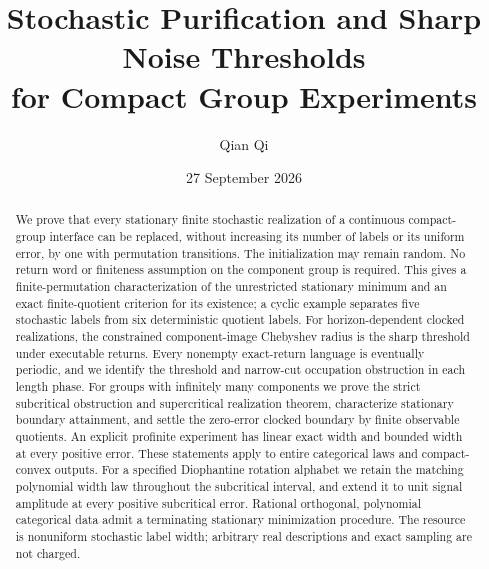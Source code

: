 \documentclass[11pt]{amsart}
\title[Stochastic purification and noise thresholds]{Stochastic Purification and Sharp Noise Thresholds\\for Compact Group Experiments}
\author{Qian Qi}
\date{27 September 2026}
\numberwithin{equation}{section}
\theoremstyle{definition}\newtheorem{definition}[theorem]{Definition}
\theoremstyle{remark}\newtheorem{remark}[theorem]{Remark}
\begin{document}
\begin{abstract}
We prove that every stationary finite stochastic realization of a continuous compact-group interface can be replaced, without increasing its number of labels or its uniform error, by one with permutation transitions. The initialization may remain random. No return word or finiteness assumption on the component group is required. This gives a finite-permutation characterization of the unrestricted stationary minimum and an exact finite-quotient criterion for its existence; a cyclic example separates five stochastic labels from six deterministic quotient labels. For horizon-dependent clocked realizations, the constrained component-image Chebyshev radius is the sharp threshold under executable returns. Every nonempty exact-return language is eventually periodic, and we identify the threshold and narrow-cut occupation obstruction in each length phase. For groups with infinitely many components we prove the strict subcritical obstruction and supercritical realization theorem, characterize stationary boundary attainment, and settle the zero-error clocked boundary by finite observable quotients. An explicit profinite experiment has linear exact width and bounded width at every positive error. These statements apply to entire categorical laws and compact-convex outputs. For a specified Diophantine rotation alphabet we retain the matching polynomial width law throughout the subcritical interval, and extend it to unit signal amplitude at every positive subcritical error. Rational orthogonal, polynomial categorical data admit a terminating stationary minimization procedure. The resource is nonuniform stochastic label width; arbitrary real descriptions and exact sampling are not charged.
\end{abstract}
\maketitle












\end{document}
